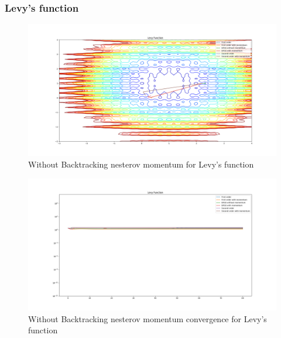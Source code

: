 \documentclass{article}
\begin{document}
\subsubsection{Levy's function}
\begin{center}
\begin{figure}[H]
	\includegraphics[width=\linewidth]{../Images/levynesterov.png}
	\caption{Without Backtracking nesterov momentum for Levy's function}
	\label{fig:Without Backtracking nesterov momentum for Levy's function}
\end{figure}

\begin{figure}[H]
	\includegraphics[width=\linewidth]{../Images/levynesterov1.png}
	\caption{Without Backtracking nesterov momentum convergence for Levy's function}
	\label{fig:Without Backtracking nesterov momentum convergence for Levy's function}
\end{figure}


\end{center}
\end{document}
